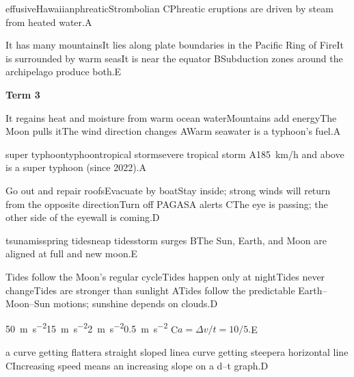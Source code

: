 \begin{gradebody}
{effusive}{Hawaiian}{phreatic}{Strombolian}
{C}{Phreatic eruptions are driven by steam from heated water.}{A}

{It has many mountains}{It lies along plate boundaries in the Pacific Ring of Fire}{It is surrounded by warm seas}{It is near the equator}
{B}{Subduction zones around the archipelago produce both.}{E}

\textbf{Term 3}

{It regains heat and moisture from warm ocean water}{Mountains add energy}{The Moon pulls it}{The wind direction changes}
{A}{Warm seawater is a typhoon's fuel.}{A}

{super typhoon}{typhoon}{tropical storm}{severe tropical storm}
{A}{\SI{185}{km/h} and above is a super typhoon (since 2022).}{A}

{Go out and repair roofs}{Evacuate by boat}{Stay inside; strong winds will return from the opposite direction}{Turn off PAGASA alerts}
{C}{The eye is passing; the other side of the eyewall is coming.}{D}

{tsunamis}{spring tides}{neap tides}{storm surges}
{B}{The Sun, Earth, and Moon are aligned at full and new moon.}{E}

{Tides follow the Moon's regular cycle}{Tides happen only at night}{Tides never change}{Tides are stronger than sunlight}
{A}{Tides follow the predictable Earth--Moon--Sun motions; sunshine depends on clouds.}{D}

{\SI{50}{\meter\per\second\squared}}{\SI{15}{\meter\per\second\squared}}{\SI{2}{\meter\per\second\squared}}{\SI{0.5}{\meter\per\second\squared}}
{C}{$a = \Delta v / t = 10/5$.}{E}

{a curve getting flatter}{a straight sloped line}{a curve getting steeper}{a horizontal line}
{C}{Increasing speed means an increasing slope on a d--t graph.}{D}


\end{gradebody}
